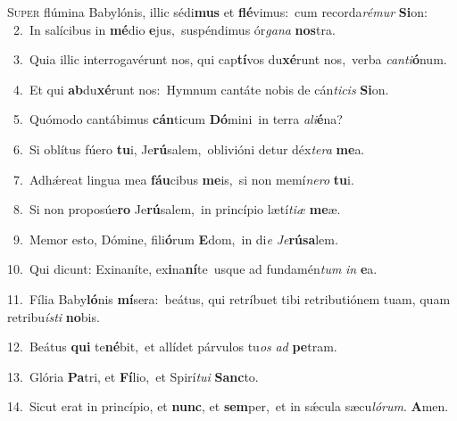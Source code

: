 \lettrine{\initial\textcolor{\initialcolor}{S}}{uper} flúmina Babylónis, illic sédi\textbf{mus} et \textbf{flé}\-vimus:~\star cum recorda\-\textit{ré}\-\textit{mur} \textbf{Si}\-on:\\
{\numbfont\textcolor{\numbcolor}{~2.}}~In salícibus in \textbf{mé}\-dio \textbf{e}\-jus,~\star suspéndimus ór\-\textit{ga}\-\textit{na} \textbf{nos}\-tra.\par
{\numbfont\textcolor{\numbcolor}{~3.}}~Quia illic interrogavérunt nos, qui cap\-\textbf{tí}\-vos du\-\textbf{xé}\-runt nos,~\star verba \textit{can}\-\textit{ti}\textbf{ó}num.\par
{\numbfont\textcolor{\numbcolor}{~4.}}~Et qui \textbf{ab}\-du\-\textbf{xé}\-runt nos:~\star Hymnum cantáte nobis de cán\-\textit{ti}\-\textit{cis} \textbf{Si}\-on.\par
{\numbfont\textcolor{\numbcolor}{~5.}}~Quómodo cantábimus \textbf{cán}\-ticum \textbf{Dó}\-mini~\star in terra \textit{a}\-\textit{li}\textbf{é}na?\par
{\numbfont\textcolor{\numbcolor}{~6.}}~Si oblítus fúero \textbf{tu}\-i, Je\-\textbf{rú}\-salem,~\star oblivióni detur déx\-\textit{te}\-\textit{ra} \textbf{me}\-a.\par
{\numbfont\textcolor{\numbcolor}{~7.}}~Adhǽreat lingua mea \textbf{fáu}\-cibus \textbf{me}\-is,~\star si non memí\-\textit{ne}\-\textit{ro} \textbf{tu}\-i.\par
{\numbfont\textcolor{\numbcolor}{~8.}}~Si non proposúe\textbf{ro} Je\-\textbf{rú}\-salem,~\star in princípio lætí\-\textit{ti}\-\textit{æ} \textbf{me}\-æ.\par
{\numbfont\textcolor{\numbcolor}{~9.}}~Memor esto, Dómine, fili\-\textbf{ó}\-rum \textbf{E}\-dom,~\star in di\textit{e} \textit{Je}\-\textbf{rú}\textbf{sa}lem.\par
{\numbfont\textcolor{\numbcolor}{10.}}~Qui dicunt: Exinaníte, ex\-\textbf{i}\-na\-\textbf{ní}\-te~\star usque ad fundamén\textit{tum} \textit{in} \textbf{e}\-a.\par
{\numbfont\textcolor{\numbcolor}{11.}}~Fília Baby\-\textbf{ló}\-nis \textbf{mí}\-sera:~\star beátus, qui retríbuet tibi retributiónem tuam, quam retribu\-\textit{ís}\-\textit{ti} \textbf{no}\-bis.\par
{\numbfont\textcolor{\numbcolor}{12.}}~Beátus \textbf{qui} te\-\textbf{né}\-bit,~\star et allídet párvulos tu\textit{os} \textit{ad} \textbf{pe}\-tram.\par
{\numbfont\textcolor{\numbcolor}{13.}}~Glória \textbf{Pa}\-tri, et \textbf{Fí}\-lio,~\star et Spirí\-\textit{tu}\-\textit{i} \textbf{Sanc}\-to.\par
{\numbfont\textcolor{\numbcolor}{14.}}~Sicut erat in princípio, et \textbf{nunc}\-, et \textbf{sem}\-per,~\star et in sǽcula sæcu\-\textit{ló}\-\textit{rum}. \textbf{A}\-men.\par
